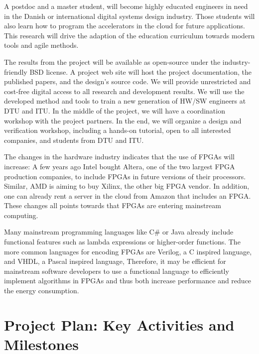 \documentclass[fleqn,12pt]{article}
\newcommand{\todo}[1]{{\it TODO: #1}}
\begin{document}
A postdoc and a master student, will become highly educated engineers in need in the Danish or international digital systems design industry. Those students will also learn how to program the accelerators in the cloud for future applications. This research will drive the adaption of the education curriculum towards modern tools and agile methods.


The results from the project will be available as open-source under the
industry-friendly BSD license.
A project web site will host the project documentation, the published papers, and the design's source code.
We will provide unrestricted and cost-free digital access to all research and development results.
%
We will use the developed method and tools to train a new generation of HW/SW engineers
at DTU and ITU.
In the middle of the project, we will have a coordination workshop with the project partners.
In the end, we will organize a design and verification workshop, including a hands-on tutorial,
open to all interested companies, and students from DTU and ITU.

The changes in the hardware industry indicates that the use of FPGAs will increase: A few years ago Intel bought Altera, one of the two largest FPGA production companies, to include FPGAs in future versions of their processors. Similar, AMD is aiming to buy Xilinx, the other big FPGA vendor. In addition, one can already rent a server in the cloud from Amazon that includes an FPGA. These changes all points towards that FPGAs are entering mainstream computing.

Many mainstream programming languages like C\# or Java already include functional features such as lambda expressions or higher-order functions. The more common languages for encoding FPGAs are Verilog, a C inspired language, and VHDL, a Pascal inspired language, Therefore, it may be efficient for mainstream software developers to use a functional language to efficiently implement algorithms in FPGAs and thus both increase performance and reduce the energy consumption.


\newpage
\section*{Project Plan: Key Activities and Milestones}



\end{document}

